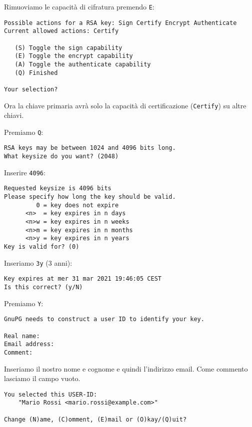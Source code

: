 Rimuoviamo le capacità di cifratura premendo \texttt{E}:

\begin{lstlisting}
Possible actions for a RSA key: Sign Certify Encrypt Authenticate
Current allowed actions: Certify

   (S) Toggle the sign capability
   (E) Toggle the encrypt capability
   (A) Toggle the authenticate capability
   (Q) Finished

Your selection?
\end{lstlisting}

Ora la chiave primaria avrà solo la capacità di certificazione
(\texttt{Certify}) su altre chiavi.

Premiamo \texttt{Q}:

\begin{lstlisting}
RSA keys may be between 1024 and 4096 bits long.
What keysize do you want? (2048)
\end{lstlisting}


Inserire \texttt{4096}:

\begin{lstlisting}
Requested keysize is 4096 bits
Please specify how long the key should be valid.
         0 = key does not expire
      <n>  = key expires in n days
      <n>w = key expires in n weeks
      <n>m = key expires in n months
      <n>y = key expires in n years
Key is valid for? (0)
\end{lstlisting}


Inseriamo \texttt{3y} (3 anni):

\begin{lstlisting}
Key expires at mer 31 mar 2021 19:46:05 CEST
Is this correct? (y/N)
\end{lstlisting}

Premiamo \texttt{Y}:

\begin{lstlisting}
GnuPG needs to construct a user ID to identify your key.

Real name:
Email address:
Comment:
\end{lstlisting}


Inseriamo il nostro nome e cognome e quindi l'indirizzo email. Come commento
lasciamo il campo vuoto.

\begin{lstlisting}
You selected this USER-ID:
    "Mario Rossi <mario.rossi@example.com>"

Change (N)ame, (C)omment, (E)mail or (O)kay/(Q)uit?
\end{lstlisting}

